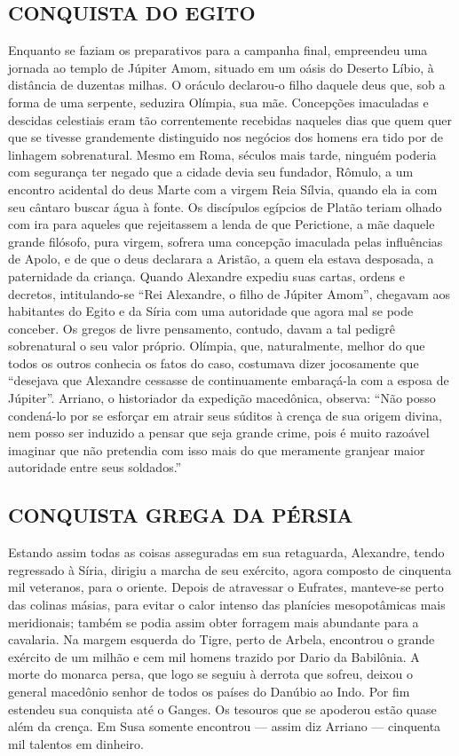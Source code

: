 \documentclass[11pt,a5paper,twoside,openany]{book}
\begin{document}
\subsection*{CONQUISTA DO EGITO}
Enquanto se faziam os preparativos para a campanha final, empreendeu uma jornada ao templo de Júpiter Amom, situado em um oásis do Deserto Líbio, à distância de duzentas milhas. O oráculo declarou-o filho daquele deus que, sob a forma de uma serpente, seduzira Olímpia, sua mãe. Concepções imaculadas e descidas celestiais eram tão correntemente recebidas naqueles dias que quem quer que se tivesse grandemente distinguido nos negócios dos homens era tido por de linhagem sobrenatural. Mesmo em Roma, séculos mais tarde, ninguém poderia com segurança ter negado que a cidade devia seu fundador, Rômulo, a um encontro acidental do deus Marte com a virgem Reia Sílvia, quando ela ia com seu cântaro buscar água à fonte. Os discípulos egípcios de Platão teriam olhado com ira para aqueles que rejeitassem a lenda de que Perictione, a mãe daquele grande filósofo, pura virgem, sofrera uma concepção imaculada pelas influências de Apolo, e de que o deus declarara a Aristão, a quem ela estava desposada, a paternidade da criança. Quando Alexandre expediu suas cartas, ordens e decretos, intitulando-se “Rei Alexandre, o filho de Júpiter Amom”, chegavam aos habitantes do Egito e da Síria com uma autoridade que agora mal se pode conceber. Os gregos de livre pensamento, contudo, davam a tal pedigrê sobrenatural o seu valor próprio. Olímpia, que, naturalmente, melhor do que todos os outros conhecia os fatos do caso, costumava dizer jocosamente que “desejava que Alexandre cessasse de continuamente embaraçá-la com a esposa de Júpiter”. Arriano, o historiador da expedição macedônica, observa: “Não posso condená-lo por se esforçar em atrair seus súditos à crença de sua origem divina, nem posso ser induzido a pensar que seja grande crime, pois é muito razoável imaginar que não pretendia com isso mais do que meramente granjear maior autoridade entre seus soldados.”

\subsection*{CONQUISTA GREGA DA PÉRSIA}
Estando assim todas as coisas asseguradas em sua retaguarda, Alexandre, tendo regressado à Síria, dirigiu a marcha de seu exército, agora composto de cinquenta mil veteranos, para o oriente. Depois de atravessar o Eufrates, manteve-se perto das colinas másias, para evitar o calor intenso das planícies mesopotâmicas mais meridionais; também se podia assim obter forragem mais abundante para a cavalaria. Na margem esquerda do Tigre, perto de Arbela, encontrou o grande exército de um milhão e cem mil homens trazido por Dario da Babilônia. A morte do monarca persa, que logo se seguiu à derrota que sofreu, deixou o general macedônio senhor de todos os países do Danúbio ao Indo. Por fim estendeu sua conquista até o Ganges. Os tesouros que se apoderou estão quase além da crença. Em Susa somente encontrou — assim diz Arriano — cinquenta mil talentos em dinheiro.
\end{document}
